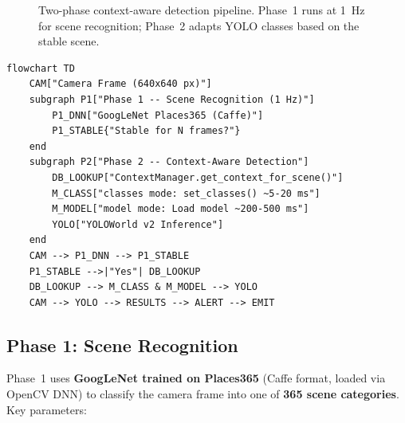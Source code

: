 \documentclass[12pt,a4paper]{article}
\begin{document}
\begin{figure}[H]
\caption{Two-phase context-aware detection pipeline. Phase~1 runs at 1~Hz for
scene recognition; Phase~2 adapts YOLO classes based on the stable scene.}
\label{fig:pipeline}
\end{figure}

\begin{tcolorbox}[colback=codebg, colframe=secondary!40,
    title=Mermaid Source (phase1\_phase2\_pipeline.mmd), fonttitle=\footnotesize\bfseries,
    breakable]
\begin{lstlisting}[style=mermaid]
flowchart TD
    CAM["Camera Frame (640x640 px)"]
    subgraph P1["Phase 1 -- Scene Recognition (1 Hz)"]
        P1_DNN["GoogLeNet Places365 (Caffe)"]
        P1_STABLE{"Stable for N frames?"}
    end
    subgraph P2["Phase 2 -- Context-Aware Detection"]
        DB_LOOKUP["ContextManager.get_context_for_scene()"]
        M_CLASS["classes mode: set_classes() ~5-20 ms"]
        M_MODEL["model mode: Load model ~200-500 ms"]
        YOLO["YOLOWorld v2 Inference"]
    end
    CAM --> P1_DNN --> P1_STABLE
    P1_STABLE -->|"Yes"| DB_LOOKUP
    DB_LOOKUP --> M_CLASS & M_MODEL --> YOLO
    CAM --> YOLO --> RESULTS --> ALERT --> EMIT
\end{lstlisting}
\end{tcolorbox}

\subsection{Phase 1: Scene Recognition}

Phase~1 uses \textbf{GoogLeNet trained on Places365} (Caffe format, loaded via
OpenCV DNN) to classify the camera frame into one of \textbf{365 scene
categories}. Key parameters:
\end{document}
